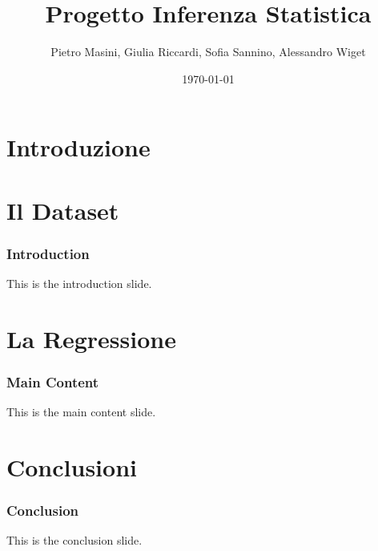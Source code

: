 \documentclass{beamer}
\title{Progetto Inferenza Statistica}
\author{Pietro Masini, Giulia Riccardi, Sofia Sannino, Alessandro Wiget}
\date{\today}
\begin{document}
\section{Introduzione}
\begin{frame}
    \titlepage
\end{frame}

\section{Il Dataset}
\begin{frame}
    \frametitle{Introduction}
    This is the introduction slide.
\end{frame}

\section{La Regressione}
\begin{frame}
    \frametitle{Main Content}
    This is the main content slide.
\end{frame}

\section{Conclusioni}
\begin{frame}
    \frametitle{Conclusion}
    This is the conclusion slide.
\end{frame}
\end{document}
